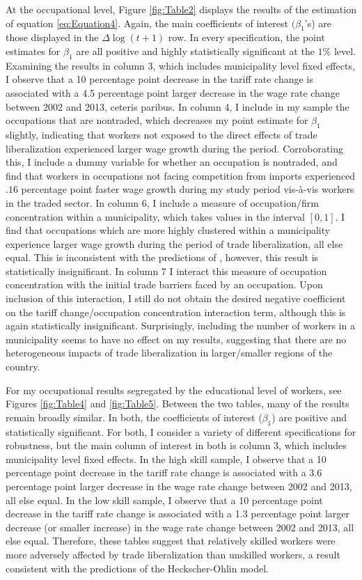 At the occupational level, Figure \ref{fig:Table2} displays the results of the estimation of equation 
\ref{eq:Equation4}. Again, the main coefficients of interest $(\beta_1$'s) are those displayed in the 
$\Delta\log(t+1)$ row. In every specification, the point estimates for $\beta_1$ are all positive
and highly statistically significant at the $1\%$ level. Examining the results in column 3, which
includes municipality level fixed effects, I observe that a 10 percentage point decrease in the tariff 
rate change is associated with a 4.5 percentage point larger decrease in the wage rate change between 
2002 and 2013, ceteris paribus. In column 4, I include in my sample the occupations that are nontraded,
which decreases my point estimate for $\beta_1$ slightly, indicating that workers not exposed to 
the direct effects of trade liberalization experienced larger wage growth during the period. 
Corroborating
this, I include a dummy variable for whether an occupation is nontraded, and find that workers in
occupations not facing competition from imports experienced $.16$ percentage point faster wage growth
during my study period vis-\`{a}-vis workers in the traded sector. In column 6, I include a measure of
occupation/firm concentration within a
municipality, which takes values in the interval $[0,1]$. I find that occupations which are more highly 
clustered within a municipality experience larger wage growth during the period of trade liberalization,
all else equal. This is inconsistent with the 
predictions of \citet{holmes1}, however, this result is statistically insignificant.
In column 7 I interact this measure
of occupation concentration with the initial trade barriers faced by an occupation.
Upon inclusion of this interaction, I still do not obtain the desired negative coefficient on the tariff
change/occupation concentration interaction term, although this is again statistically insignificant.
Surprisingly, including the number of workers in a municipality seems to have no effect on my
results, suggesting that there are no heterogeneous impacts of trade liberalization in larger/smaller
regions of the country.

For my occupational results segregated by the educational level of workers, see Figures \ref{fig:Table4}
and \ref{fig:Table5}. Between the two tables, many of the results remain broadly similar. In both,
the coefficients of interest ($\beta_1$) are positive and statistically significant. For both,
I consider a variety of different specifications for robustness, but the main column of interest
in both is column 3, which includes municipality level fixed effects. In the high skill sample,
I observe that a 10 percentage point decrease in the tariff 
rate change is associated with a 3.6 percentage point larger decrease in the wage rate change between 
2002 and 2013, all else equal. In the low skill sample,
I observe that a 10 percentage point decrease in the tariff 
rate change is associated with a 1.3 percentage point larger decrease (or smaller increase) 
in the wage rate change between 2002 and 2013, all else equal. Therefore, these tables suggest
that relatively skilled workers were more adversely affected by trade liberalization than unskilled
workers, a result consistent with the predictions of the Heckscher-Ohlin model.